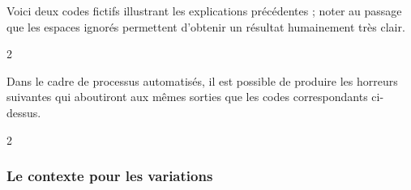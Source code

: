 \documentclass[10pt, a4paper]{article}
\begin{document}
Voici deux codes fictifs illustrant les explications précédentes ; noter au passage que les espaces ignorés permettent d'obtenir un résultat humainement très clair.
\begin{multicols}{2}

\end{multicols}

Dans le cadre de processus automatisés, il est possible de produire les horreurs suivantes qui aboutiront aux mêmes sorties que les codes correspondants ci-dessus.
\begin{multicols}{2}

\end{multicols}



\subsubsection{Le contexte  pour les variations}
\end{document}
